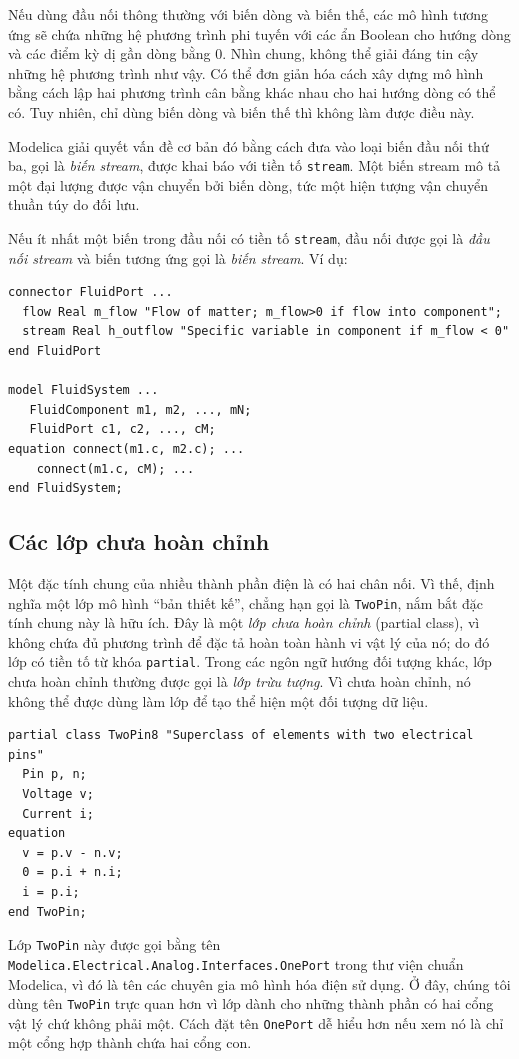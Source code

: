 Nếu dùng đầu nối thông thường với biến dòng và biến thế, các mô hình tương ứng sẽ chứa những hệ phương trình phi tuyến với các ẩn Boolean cho hướng dòng và các điểm kỳ dị gần dòng bằng 0. Nhìn chung, không thể giải đáng tin cậy những hệ phương trình như vậy. Có thể đơn giản hóa cách xây dựng mô hình bằng cách lập hai phương trình cân bằng khác nhau cho hai hướng dòng có thể có. Tuy nhiên, chỉ dùng biến dòng và biến thế thì không làm được điều này.

Modelica giải quyết vấn đề cơ bản đó bằng cách đưa vào loại biến đầu nối thứ ba, gọi là \emph{biến stream}, được khai báo với tiền tố \texttt{stream}. Một biến stream mô tả một đại lượng được vận chuyển bởi biến dòng, tức một hiện tượng vận chuyển thuần túy do đối lưu.

Nếu ít nhất một biến trong đầu nối có tiền tố \texttt{stream}, đầu nối được gọi là \emph{đầu nối stream} và biến tương ứng gọi là \emph{biến stream}. Ví dụ:
\begin{verbatim}
connector FluidPort ...
  flow Real m_flow "Flow of matter; m_flow>0 if flow into component";
  stream Real h_outflow "Specific variable in component if m_flow < 0"
end FluidPort

model FluidSystem ...
   FluidComponent m1, m2, ..., mN;
   FluidPort c1, c2, ..., cM;
equation connect(m1.c, m2.c); ...
    connect(m1.c, cM); ...
end FluidSystem;
\end{verbatim}

\subsection{Các lớp chưa hoàn chỉnh}
Một đặc tính chung của nhiều thành phần điện là có hai chân nối. Vì thế, định nghĩa một lớp mô hình ``bản thiết kế'', chẳng hạn gọi là \texttt{TwoPin}, nắm bắt đặc tính chung này là hữu ích. Đây là một \emph{lớp chưa hoàn chỉnh} (partial class), vì không chứa đủ phương trình để đặc tả hoàn toàn hành vi vật lý của nó; do đó lớp có tiền tố từ khóa \texttt{partial}. Trong các ngôn ngữ hướng đối tượng khác, lớp chưa hoàn chỉnh thường được gọi là \emph{lớp trừu tượng}. Vì chưa hoàn chỉnh, nó không thể được dùng làm lớp để tạo thể hiện một đối tượng dữ liệu.
\begin{verbatim}
partial class TwoPin8 "Superclass of elements with two electrical pins"
  Pin p, n;
  Voltage v;
  Current i;
equation
  v = p.v - n.v;
  0 = p.i + n.i;
  i = p.i;
end TwoPin;
\end{verbatim}
Lớp \texttt{TwoPin} này được gọi bằng tên \texttt{Modelica.Electrical.Analog.Interfaces.OnePort} trong thư viện chuẩn Modelica, vì đó là tên các chuyên gia mô hình hóa điện sử dụng. Ở đây, chúng tôi dùng tên \texttt{TwoPin} trực quan hơn vì lớp dành cho những thành phần có hai cổng vật lý chứ không phải một. Cách đặt tên \texttt{OnePort} dễ hiểu hơn nếu xem nó là chỉ một cổng hợp thành chứa hai cổng con.

